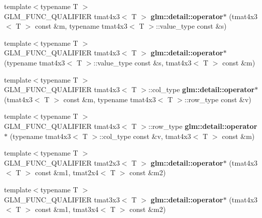 \begin{DoxyCompactItemize}
\item 
\hypertarget{namespaceglm_1_1detail_a792efb5b12898b4ed8f5a9ea53af0f87}{}{\footnotesize template$<$typename T $>$ }\\G\+L\+M\+\_\+\+F\+U\+N\+C\+\_\+\+Q\+U\+A\+L\+I\+F\+I\+E\+R tmat4x3$<$ T $>$ {\bfseries glm\+::detail\+::operator$\ast$} (tmat4x3$<$ T $>$ const \&m, typename tmat4x3$<$ T $>$\+::value\+\_\+type const \&s)\label{namespaceglm_1_1detail_a792efb5b12898b4ed8f5a9ea53af0f87}

\item 
\hypertarget{namespaceglm_1_1detail_a38e83a6d2c3293639f02c3c830938d27}{}{\footnotesize template$<$typename T $>$ }\\G\+L\+M\+\_\+\+F\+U\+N\+C\+\_\+\+Q\+U\+A\+L\+I\+F\+I\+E\+R tmat4x3$<$ T $>$ {\bfseries glm\+::detail\+::operator$\ast$} (typename tmat4x3$<$ T $>$\+::value\+\_\+type const \&s, tmat4x3$<$ T $>$ const \&m)\label{namespaceglm_1_1detail_a38e83a6d2c3293639f02c3c830938d27}

\item 
\hypertarget{namespaceglm_1_1detail_a2f849ed4defa8dd34197cd36c4523d03}{}{\footnotesize template$<$typename T $>$ }\\G\+L\+M\+\_\+\+F\+U\+N\+C\+\_\+\+Q\+U\+A\+L\+I\+F\+I\+E\+R tmat4x3$<$ T $>$\+::col\+\_\+type {\bfseries glm\+::detail\+::operator$\ast$} (tmat4x3$<$ T $>$ const \&m, typename tmat4x3$<$ T $>$\+::row\+\_\+type const \&v)\label{namespaceglm_1_1detail_a2f849ed4defa8dd34197cd36c4523d03}

\item 
\hypertarget{namespaceglm_1_1detail_ad604303298d0bac0d6090e08b71cdd1b}{}{\footnotesize template$<$typename T $>$ }\\G\+L\+M\+\_\+\+F\+U\+N\+C\+\_\+\+Q\+U\+A\+L\+I\+F\+I\+E\+R tmat4x3$<$ T $>$\+::row\+\_\+type {\bfseries glm\+::detail\+::operator$\ast$} (typename tmat4x3$<$ T $>$\+::col\+\_\+type const \&v, tmat4x3$<$ T $>$ const \&m)\label{namespaceglm_1_1detail_ad604303298d0bac0d6090e08b71cdd1b}

\item 
\hypertarget{namespaceglm_1_1detail_af2cbce13e1479262e28ec5c983249343}{}{\footnotesize template$<$typename T $>$ }\\G\+L\+M\+\_\+\+F\+U\+N\+C\+\_\+\+Q\+U\+A\+L\+I\+F\+I\+E\+R tmat2x3$<$ T $>$ {\bfseries glm\+::detail\+::operator$\ast$} (tmat4x3$<$ T $>$ const \&m1, tmat2x4$<$ T $>$ const \&m2)\label{namespaceglm_1_1detail_af2cbce13e1479262e28ec5c983249343}

\item 
\hypertarget{namespaceglm_1_1detail_acc14ee84ccdddaded52b00cf13dc4ec9}{}{\footnotesize template$<$typename T $>$ }\\G\+L\+M\+\_\+\+F\+U\+N\+C\+\_\+\+Q\+U\+A\+L\+I\+F\+I\+E\+R tmat3x3$<$ T $>$ {\bfseries glm\+::detail\+::operator$\ast$} (tmat4x3$<$ T $>$ const \&m1, tmat3x4$<$ T $>$ const \&m2)\label{namespaceglm_1_1detail_acc14ee84ccdddaded52b00cf13dc4ec9}


\end{DoxyCompactItemize}
